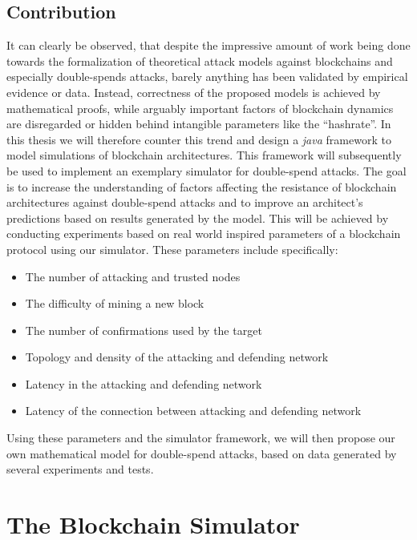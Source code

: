 \documentclass[a4paper,12pt,twoside]{report}
\begin{document}
\section{Contribution}
It can clearly be observed, that despite the impressive amount of work being done towards the formalization of theoretical attack models against blockchains and especially double-spends attacks, barely anything has been validated by empirical evidence or data. Instead, correctness of the proposed models is achieved by mathematical proofs, while arguably important factors of blockchain dynamics are disregarded or hidden behind intangible parameters like the ``hashrate''. In this thesis we will therefore counter this trend and design a \textit{java} framework to model simulations of blockchain architectures. This framework will subsequently be used to implement an exemplary simulator for double-spend attacks. The goal is to increase the understanding of factors affecting the resistance of blockchain architectures against double-spend attacks and to improve an architect's predictions based on results generated by the model. This will be achieved by conducting experiments based on real world inspired parameters of a blockchain protocol using our simulator. These parameters include specifically:
\begin{itemize}
\item The number of attacking and trusted nodes
\item The difficulty of mining a new block
\item The number of confirmations used by the target
\item Topology and density of the attacking and defending network
\item Latency in the attacking and defending network
\item Latency of the connection between attacking and defending network
\end{itemize}
Using these parameters and the simulator framework, we will then propose our own mathematical model for double-spend attacks, based on data generated by several experiments and tests.

\chapter{The Blockchain Simulator}
\end{document}
